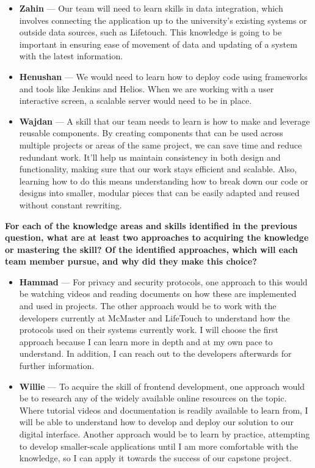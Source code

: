 \documentclass[12pt]{article}
\begin{document}
\begin{portrait}
\begin{itemize}
    \item \textbf{Zahin} — Our team will need to learn skills in data integration, which involves connecting the application up to the university's existing systems or outside data sources, such as Lifetouch. This knowledge is going to be important in ensuring ease of movement of data and updating of a system with the latest information.
    
    \item \textbf{Henushan} — We would need to learn how to deploy code using frameworks and tools like Jenkins and Helios. When we are working with a user interactive screen, a scalable server would need to be in place.
    
    \item \textbf{Wajdan} — A skill that our team needs to learn is how to make and leverage reusable components. By creating components that can be used across multiple projects or areas of the same project, we can save time and reduce redundant work. It’ll help us maintain consistency in both design and functionality, making sure that our work stays efficient and scalable. Also, learning how to do this means understanding how to break down our code or designs into smaller, modular pieces that can be easily adapted and reused without constant rewriting.
\end{itemize}

\vspace{1em}

\textbf{For each of the knowledge areas and skills identified in the previous question, what are at least two approaches to acquiring the knowledge or mastering the skill? Of the identified approaches, which will each team member pursue, and why did they make this choice?}

\begin{itemize}
    \item \textbf{Hammad} — For privacy and security protocols, one approach to this would be watching videos and reading documents on how these are implemented and used in projects. The other approach would be to work with the developers currently at McMaster and LifeTouch to understand how the protocols used on their systems currently work. I will choose the first approach because I can learn more in depth and at my own pace to understand. In addition, I can reach out to the developers afterwards for further information.

    \item \textbf{Willie} — To acquire the skill of frontend development, one approach would be to research any of the widely available online resources on the topic. Where tutorial videos and documentation is readily available to learn from, I will be able to understand how to develop and deploy our solution to our digital interface. Another approach would be to learn by practice, attempting to develop smaller-scale applications until I am more comfortable with the knowledge, so I can apply it towards the success of our capstone project.


\end{itemize}
\end{portrait}
\end{document}
